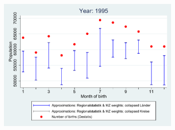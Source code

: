 \documentclass[a4paper ]{article}
\begin{document}
\begin{figure}[h]
\begin{subfigure}[t]{0.48\textwidth}
\end{subfigure}
\begin{subfigure}[t]{0.48\textwidth}
		\centering
		\includegraphics[width=0.99\textwidth]{comparison_population_1995.pdf}		
\end{subfigure}
\end{figure}
\end{document}
